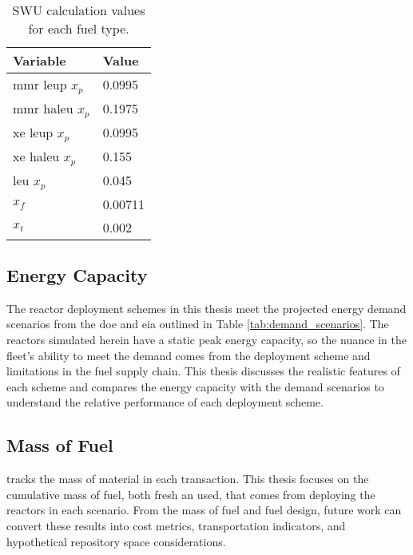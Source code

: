 \begin{table}[H]
    \centering
    \caption{SWU calculation values for each fuel type.}
    \label{tab:swu_vals}
    \begin{tabular}{l l}
        \hline
        \textbf{Variable} & \textbf{Value}\\
        \hline
        \gls{mmr} \gls{leup} $x_p$ & 0.0995\\
        \gls{mmr} \gls{haleu} $x_p$ & 0.1975\\
        \gls{xe} \gls{leup} $x_p$ & 0.0995\\
        \gls{xe} \gls{haleu} $x_p$ & 0.155\\
        \gls{leu} $x_p$ & 0.045\\
        $x_f$ & 0.00711\\
        $x_t$ & 0.002\\
        \hline
    \end{tabular}
\end{table}

\subsection{Energy Capacity}
\label{sec:energy_output}

The reactor deployment schemes in this thesis meet the projected energy demand scenarios from the \gls{doe} and \gls{eia} outlined in Table \ref{tab:demand_scenarios}. The reactors simulated herein have a static peak energy capacity, so the nuance in the fleet's ability to meet the demand comes from the deployment scheme and limitations in the fuel supply chain. This thesis discusses the realistic features of each scheme and compares the energy capacity with the demand scenarios to understand the relative performance of each deployment scheme.


\subsection{Mass of Fuel}
\label{sec:mass_of_fuel}

\cyclus tracks the mass of material in each transaction. This thesis focuses on the cumulative mass of fuel, both fresh an used, that comes from deploying the reactors in each scenario. From the mass of fuel and fuel design, future work can convert these results into cost metrics, transportation indicators, and hypothetical repository space considerations.
